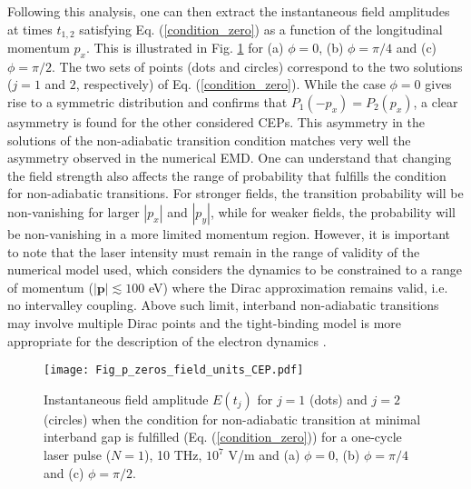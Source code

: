 \documentclass[9pt,twocolumn,twoside]{osajnl}
\begin{document}
Following this analysis, one can then extract the instantaneous field amplitudes at  times $t_{1,2}$ satisfying Eq. (\ref{condition_zero}) as a function of the longitudinal momentum $p_x$.
 This is illustrated in Fig. \ref{fig_p_asym_CEP} for (a) $\phi=0$, (b) $\phi=\pi/4$ and (c) $\phi=\pi/2$. The two sets of points (dots and circles) correspond to the two solutions ($j=1$ and $2$, respectively) of Eq. (\ref{condition_zero}). While the case $\phi=0$ gives rise to a symmetric distribution and confirms that $P_{1}(-p_{x}) = P_{2}(p_{x})$, a clear asymmetry is found for the other considered CEPs.   
This asymmetry in the solutions of the non-adiabatic transition condition matches very well the asymmetry observed in the numerical EMD.
One can understand that changing the field strength also affects the range of probability that fulfills the condition for non-adiabatic transitions. 
For stronger fields, the transition probability will be non-vanishing for  larger $|p_x|$ and $|p_y|$, while for weaker fields, the probability will be non-vanishing in a more limited momentum region.  However, it is important to note that the laser intensity must remain in the range of validity of the numerical model used, which considers the dynamics to be constrained to a range of momentum ($|\mathbf{p}|\lesssim 100$ eV) where the Dirac approximation remains valid, i.e. no intervalley coupling. Above such limit, interband non-adiabatic transitions may involve multiple Dirac points  and the tight-binding model is more appropriate for the description of the electron dynamics \cite{PhysRevB.91.045439, Higuchi:2017fk}.

\begin{figure}
\texttt{[image: Fig\_p\_zeros\_field\_units\_CEP.pdf]}
\caption{Instantaneous field amplitude $E(t_j)$ for $j=1$ (dots) and $j=2$ (circles) when the condition for non-adiabatic transition at minimal interband gap is fulfilled (Eq. (\ref{condition_zero})) for a one-cycle laser pulse ($N=1$), 10 THz,  $10^7$ V/m  and (a) $\phi=0$, (b) $\phi=\pi/4$ and (c) $\phi=\pi/2$.}
\label{fig_p_asym_CEP}
\end{figure}


\end{document}
